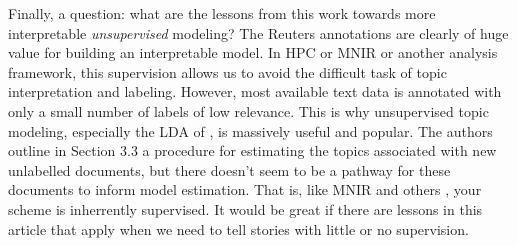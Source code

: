 \documentclass[12pt]{article}
\begin{document}
Finally, a question: what are the lessons from this work
towards more interpretable {\it unsupervised} modeling? The Reuters
annotations are clearly of huge value for building an interpretable model.
In HPC or MNIR or another analysis framework, this supervision allows us to avoid the
difficult task of topic interpretation and labeling.  However, most available
text data is annotated with only a small number of labels of low relevance.
This is why unsupervised topic modeling, especially the LDA of
\cite{blei2012probabilistic}, is massively useful and popular. The authors
outline in Section 3.3 a procedure for estimating the topics associated with
new  unlabelled documents, but there doesn't seem to be a pathway for these
documents to inform model estimation.  That is, like MNIR and others , your
scheme is inherrently supervised.  It would be great if there are lessons in
this article that apply when we need to tell stories with little or no supervision.

\small


\end{document}
